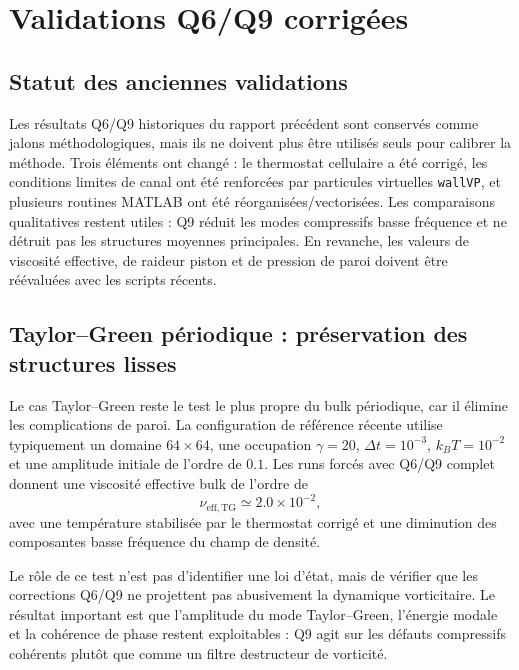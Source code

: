 \documentclass[11pt,a4paper]{article}
\begin{document}
\section{Validations Q6/Q9 corrigées}

\subsection{Statut des anciennes validations}

Les résultats Q6/Q9 historiques du rapport précédent sont conservés comme jalons méthodologiques, mais ils ne doivent plus être utilisés seuls pour calibrer la méthode. Trois éléments ont changé : le thermostat cellulaire a été corrigé, les conditions limites de canal ont été renforcées par particules virtuelles \texttt{wallVP}, et plusieurs routines MATLAB ont été réorganisées/vectorisées. Les comparaisons qualitatives restent utiles : Q9 réduit les modes compressifs basse fréquence et ne détruit pas les structures moyennes principales. En revanche, les valeurs de viscosité effective, de raideur piston et de pression de paroi doivent être réévaluées avec les scripts récents.

\subsection{Taylor--Green périodique : préservation des structures lisses}

Le cas Taylor--Green reste le test le plus propre du bulk périodique, car il élimine les complications de paroi. La configuration de référence récente utilise typiquement un domaine \(64\times64\), une occupation \(\gamma=20\), \(\Delta t=10^{-3}\), \(k_BT=10^{-2}\) et une amplitude initiale de l'ordre de \(0.1\). Les runs forcés avec Q6/Q9 complet donnent une viscosité effective bulk de l'ordre de
\begin{equation}
  \nu_{\mathrm{eff,TG}} \simeq 2.0\times10^{-2},
\end{equation}
avec une température stabilisée par le thermostat corrigé et une diminution des composantes basse fréquence du champ de densité.

Le rôle de ce test n'est pas d'identifier une loi d'état, mais de vérifier que les corrections Q6/Q9 ne projettent pas abusivement la dynamique vorticitaire. Le résultat important est que l'amplitude du mode Taylor--Green, l'énergie modale et la cohérence de phase restent exploitables : Q9 agit sur les défauts compressifs cohérents plutôt que comme un filtre destructeur de vorticité.
\end{document}
